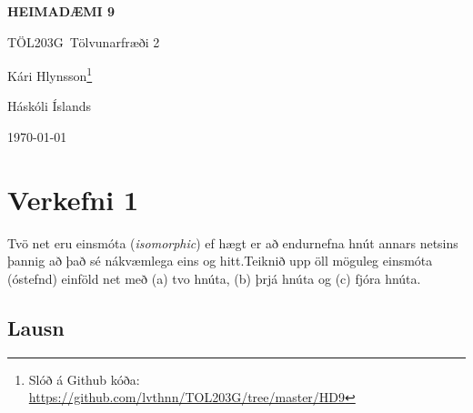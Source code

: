 \documentclass[12pt, a4paper, hidelinks]{article}
\newcommand{\doctitle}{\uppercase{Heimadæmi 9}}
\newcommand{\coursename}{Tölvunarfræði 2}
\newcommand{\coursenum}{TÖL203G}
\begin{document}
\thispagestyle{plain}
\centerline{\bfseries\Large\doctitle}
\medskip
\centerline{\large\coursenum\ \coursename}
\bigskip

\centerline{\large Kári Hlynsson\footnote{Slóð á Github kóða: \url{https://github.com/lvthnn/TOL203G/tree/master/HD9}}}
\bigskip
\centerline{Háskóli Íslands}
\medskip
\centerline{\today}

\section*{Verkefni 1}
Tvö net eru einsmóta (\emph{isomorphic}) ef hægt er að endurnefna hnút annars netsins þannig að það sé nákvæmlega eins og hitt.\@ Teiknið upp öll möguleg einsmóta (óstefnd) einföld net með (a) tvo hnúta, (b) þrjá hnúta og (c) fjóra hnúta.

\subsection*{Lausn}
\end{document}
